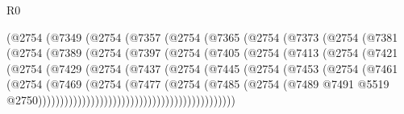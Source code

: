 \begin{lexlean}{R0}
\begin{coremodule}
                  (@2754
                    (@7349
                      (@2754
                        (@7357
                          (@2754
                            (@7365
                              (@2754
                                (@7373
                                  (@2754
                                    (@7381
                                      (@2754
                                        (@7389
                                          (@2754
                                            (@7397
                                              (@2754
                                                (@7405
                                                  (@2754
                                                    (@7413
                                                      (@2754
                                                        (@7421
                                                          (@2754
                                                            (@7429
                                                              (@2754
                                                                (@7437
                                                                  (@2754
                                                                    (@7445
                                                                      (@2754
                                                                        (@7453
                                                                          (@2754
                                                                            (@7461
                                                                              (@2754
                                                                                (@7469
                                                                                  (@2754
                                                                                    (@7477
                                                                                      (@2754
                                                                                        (@7485
                                                                                          (@2754
                                                                                            (@7489
                                                                                              @7491
                                                                                              @5519
                                                                                              @2750)))))))))))))))))))))))))))))))))))))))))))))

\end{coremodule}
\end{lexlean}
